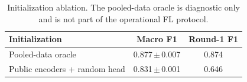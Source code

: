 \begin{table}[t]
\caption{Initialization ablation. The pooled-data oracle is diagnostic
only and is not part of the operational FL protocol.}
\label{tab:warmstart}
\centering\footnotesize
\begin{tabular}{lcc}
\toprule
Initialization & Macro F1 & Round-1 F1\\
\midrule
Pooled-data oracle & 0.877\,$\pm$\,0.007 & 0.874 \\
Public encoders + random head & 0.831\,$\pm$\,0.001 & 0.646 \\
\bottomrule
\end{tabular}
\end{table}
